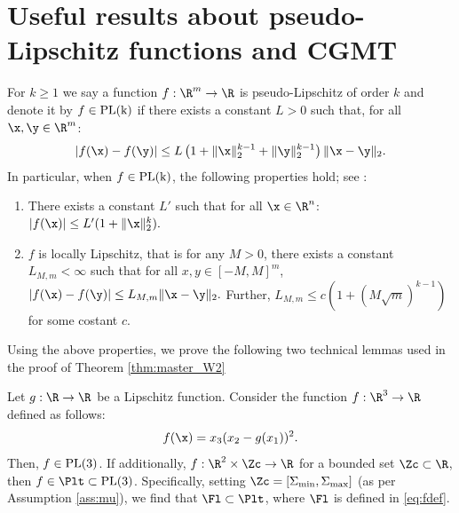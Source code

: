 
\section{Useful results about pseudo-Lipschitz functions and CGMT}\label{SM useful fact}
For $k\geq 1$ we say a function $f:\R^m\rightarrow\R$ is pseudo-Lipschitz of order $k$ and denote it by $f\in \rm{PL}(k)$ if there exists a constant $L>0$ such that, for all $\x,\y\in\R^m$:
\begin{align}
|f(\x)-f(\y)|\leq L\left(1+\|\x\|_2^{k-1}+\|\y\|_2^{k-1}\right)\|\x-\y\|_2.\label{PL func}
\end{align}
In particular, when $f\in\rm{PL}(k)$, the following properties hold; see \cite{bayati2011dynamics}:
\begin{enumerate}
\item There exists a constant $L'$ such that for all $\x\in\R^n$: $|f(\x)|\leq L'(1+\|\x\|_2^k).$

\item $f$ is locally Lipschitz, that is for any $M>0$, there exists a constant $L_{M,m}<\infty$ such that for all $x,y\in[-M,M]^m$,
$
|f(\x)-f(\y)| \leq L_{M,m}\|\x-\y\|_2.
$
Further, $L_{M,m}\leq c(1+(M\sqrt{m})^{k-1})$ for some costant $c$.
\end{enumerate}

Using the above properties, we prove the following two technical lemmas used in the proof of Theorem \ref{thm:master_W2}

\begin{lemma}\label{lem:fL}
Let $g:\R\rightarrow\R$ be a Lipschitz function. Consider the function $f:\R^3\rightarrow\R$ defined as follows:
$$
f(\x) = x_3(x_2-g(x_1))^2.
$$
Then, $f\in\rm{PL}(3)$. If additionally, $f:\R^2\times \Zc\rightarrow\R$ for a bounded set $\Zc\subset\R$, then $f\in\Plt\subset\rm{PL}(3)$. Specifically, setting $\Zc=[\Sigma_{\min},\Sigma_{\max}]$ (as per Assumption \ref{ass:mu}), we find that $\Fl\subset\Plt$, where $\Fl$ is defined in \eqref{eq:fdef}.
\end{lemma}

